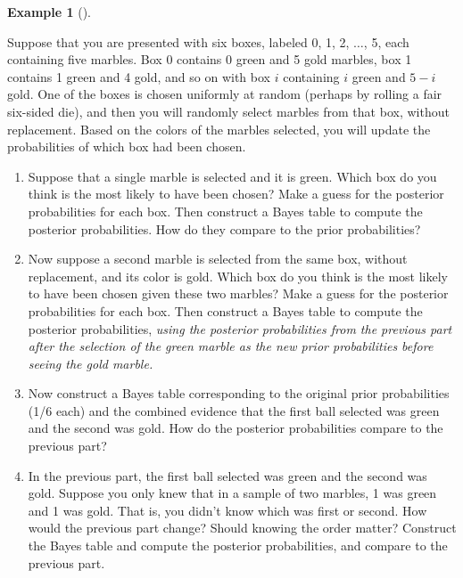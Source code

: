 \documentclass[
  letterpaper,
  DIV=11,
  numbers=noendperiod]{scrreprt}
\providecommand{\tightlist}{%
  \setlength{\itemsep}{0pt}\setlength{\parskip}{0pt}}
\theoremstyle{plain}
\theoremstyle{definition}
\newtheorem{example}{Example}[chapter]
\theoremstyle{definition}
\theoremstyle{definition}
\theoremstyle{remark}
\begin{document}
\begin{tcolorbox}[enhanced jigsaw, opacityback=0, left=2mm, colframe=quarto-callout-note-color-frame, toprule=.15mm, breakable, colback=white, leftrule=.75mm, arc=.35mm, rightrule=.15mm, bottomrule=.15mm]

\begin{example}[]\protect\hypertarget{exm-bayes-marbles}{}\label{exm-bayes-marbles}

Suppose that you are presented with six boxes, labeled 0, 1, 2,
\(\ldots\), 5, each containing five marbles. Box 0 contains 0 green and
5 gold marbles, box 1 contains 1 green and 4 gold, and so on with box
\(i\) containing \(i\) green and \(5-i\) gold. One of the boxes is
chosen uniformly at random (perhaps by rolling a fair six-sided die),
and then you will randomly select marbles from that box, without
replacement. Based on the colors of the marbles selected, you will
update the probabilities of which box had been chosen.

\begin{enumerate}
\def\labelenumi{\arabic{enumi}.}
\tightlist
\item
  Suppose that a single marble is selected and it is green. Which box do
  you think is the most likely to have been chosen? Make a guess for the
  posterior probabilities for each box. Then construct a Bayes table to
  compute the posterior probabilities. How do they compare to the prior
  probabilities?
\item
  Now suppose a second marble is selected from the same box, without
  replacement, and its color is gold. Which box do you think is the most
  likely to have been chosen given these two marbles? Make a guess for
  the posterior probabilities for each box. Then construct a Bayes table
  to compute the posterior probabilities, \emph{using the posterior
  probabilities from the previous part after the selection of the green
  marble as the new prior probabilities before seeing the gold marble.}
\item
  Now construct a Bayes table corresponding to the original prior
  probabilities (1/6 each) and the combined evidence that the first ball
  selected was green and the second was gold. How do the posterior
  probabilities compare to the previous part?
\item
  In the previous part, the first ball selected was green and the second
  was gold. Suppose you only knew that in a sample of two marbles, 1 was
  green and 1 was gold. That is, you didn't know which was first or
  second. How would the previous part change? Should knowing the order
  matter? Construct the Bayes table and compute the posterior
  probabilities, and compare to the previous part.
\end{enumerate}

\end{example}

\end{tcolorbox}
\end{document}
